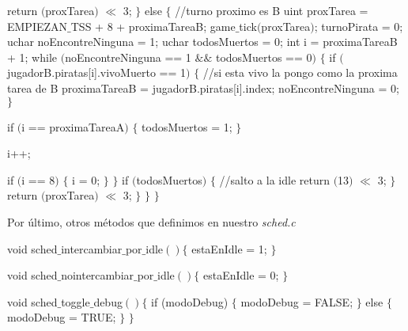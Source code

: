 \begin{algorithmic}
      \State \tab \tab  \tab \tab  return $($proxTarea$)$ $\ll$ 3;
   \State \tab \tab  \tab $\}$ else $\{$
      \State \tab \tab  \tab \tab  //turno proximo es B
      \State \tab \tab  \tab \tab  uint proxTarea = EMPIEZAN$\_$TSS + 8 + proximaTareaB;
      \State \tab \tab  \tab \tab  game$\_$tick$($proxTarea$)$;
      \State \tab \tab  \tab \tab  turnoPirata = 0;
      \State \tab \tab  \tab \tab  uchar noEncontreNinguna = 1;
      \State \tab \tab  \tab \tab  uchar todosMuertos = 0;
      \State \tab \tab  \tab \tab  int i = proximaTareaB + 1;
      \State \tab \tab  \tab \tab  while $($noEncontreNinguna == 1 $\&\&$ todosMuertos == 0$)$ $\{$
    \State \tab \tab  \tab \tab \tab    if $($jugadorB.piratas[i].vivoMuerto == 1$)$ $\{$
          //si esta vivo la pongo como la proxima tarea de B
          \State \tab \tab  \tab \tab \tab \tab proximaTareaB = jugadorB.piratas[i].index;
          \State \tab \tab  \tab \tab \tab \tab noEncontreNinguna = 0;
    \State \tab \tab  \tab \tab \tab    $\}$

    \State \tab \tab  \tab \tab \tab    if $($i == proximaTareaA$)$ $\{$
          \State \tab \tab  \tab \tab \tab \tab todosMuertos = 1;
    \State \tab \tab  \tab \tab \tab    $\}$

    \State \tab \tab  \tab \tab \tab    i++;

     \State \tab \tab  \tab \tab \tab   if $($i == 8$)$ $\{$
          \State \tab \tab  \tab \tab \tab \tab i = 0;
     \State \tab \tab  \tab \tab \tab   $\}$
      \State \tab \tab  \tab \tab $\}$
      \State \tab \tab  \tab \tab if $($todosMuertos$)$ $\{$
        //salto a la idle
        \State \tab \tab  \tab \tab \tab return $($13$)$ $\ll$ 3;
      \State \tab \tab  \tab \tab $\}$
      \State \tab \tab  \tab \tab return $($proxTarea$)$ $\ll$ 3;
\State \tab \tab  \tab    $\}$
\State \tab \tab    $\}$
\State \tab  $\}$
\end{algorithmic}

Por \'ultimo, otros m\'etodos que definimos en nuestro \textit{sched.c}
\begin{algorithmic}
    \State \tab void sched$\_$intercambiar$\_$por$\_$idle$() \{$
        \State \tab \tab estaEnIdle = 1;
    \State \tab $\}$     
\end{algorithmic}

\begin{algorithmic}
    \State \tab void sched$\_$nointercambiar$\_$por$\_$idle$() \{$
        \State \tab \tab estaEnIdle = 0;
    \State \tab $\}$     
\end{algorithmic}

\begin{algorithmic}
    \State \tab void sched$\_$toggle$\_$debug$() \{$
        \State \tab \tab if (modoDebug) $\{$
        \State \tab \tab \tab modoDebug = FALSE;
        \State \tab \tab $\}$ else $\{$
        \State \tab \tab \tab modoDebug = TRUE;
        \State \tab \tab$\}$
    \State \tab $\}$     
\end{algorithmic}
